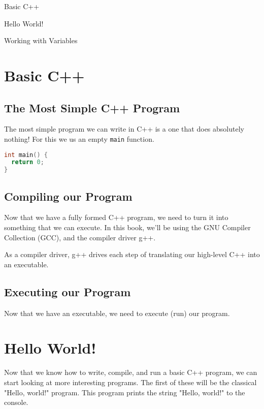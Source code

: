 \documentclass[11pt,fancy,authoryear]{elegantbook}
\begin{document}
\begin{introduction}
  \item Basic C++
  \item Hello World!
  \item Working with Variables
\end{introduction}

\section{Basic C++}

\subsection{The Most Simple C++ Program}

The most simple program we can write in C++ is a one that does absolutely nothing! For this we us an empty \lstinline{main} function.

\begin{lstlisting}[language=C++]
int main() {
  return 0;
}
\end{lstlisting}

\subsection{Compiling our Program}

Now that we have a fully formed C++ program, we need to turn it into something that we can execute. In this book, we'll be using the GNU Compiler Collection (GCC), and the compiler driver g++.

As a compiler driver, g++ drives each step of translating our high-level C++ into an executable.

\subsection{Executing our Program}

Now that we have an executable, we need to execute (run) our program.

\section{Hello World!}

Now that we know how to write, compile, and run a basic C++ program, we can start looking at more interesting programs. The first of these will be the classical "Hello, world!" program. This program prints the string "Hello, world!" to the console.
\end{document}
